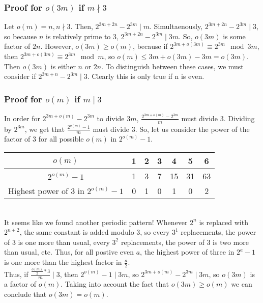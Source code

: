 \documentclass{article}
\begin{document}
  \subsubsection{Proof for  $o(3m)$ if $m \nmid 3$}
  Let $o(m) = n, n \nmid 3$. Then, $2^{3m+2n}-2^{3m}\mid m$. Simultaenously, $2^{3m+2n}-2^{3m} \mid 3$, so because $n$ is relatively prime to 3, $2^{3m+2n} - 2^{3m} \mid 3m$. So, $o(3m)$ is some factor of $2n$. However, $o(3m) \geq o(m)$, because if $2^{3m+o(3m)} \equiv 2^{3m} \mod 3m$, then $2^{3m+o(3m)} \equiv 2^{3m} \mod m$, so $o(m) \leq 3m+o(3m) - 3m = o(3m)$. Then $o(3m)$ is either $n$ or $2n$. To distinguish between these cases, we must consider if $2^{3m + n} - 2^{3m} \mid 3$. Clearly this is only true if n is even.
  \subsubsection{Proof for $o(m)$ if $m \mid 3$}
  In order for $2^{3m + o(m)} - 2^{3m}$ to divide $3m$, $\frac{2^{3m + o(m)} - 2^{3m}}{m}$ must divide 3. Dividing by $2^{3m}$, we get that $\frac{2^{o(m)}-1}{m}$ must divide 3. So, let us consider the power of the factor of 3 for all possible $o(m)$ in $2^{o(m)}-1$.\\
  \begin{tabular} {|c|c|c|c|c|c|c|}
    \hline $o(m)$                              & 1 & 2 & 3 & 4  &  5 & 6 \\
    \hline $2^{o(m)}-1$                         & 1 & 3 & 7 & 15 & 31 & 63\\
    \hline Highest power of 3 in $2^{o(m)}-1$   & 0 & 1 & 0 & 1  & 0  & 2 \\
    \hline 
  \end{tabular}\\
  
  It seems like we found another periodic pattern! Whenever $2^n$ is replaced with $2^{n+2}$, the same constant is added modulo 3, so every $3^1$ replacements, the power of 3 is one more than usual, every $3^2$ replacements, the power of 3 is two more than usual, etc. Thus, for all postive even $a$, the highest power of three in $2^a - 1$ is one more than the highest factor in $\frac{a}{2}$.\\

  Thus, if $\frac{\frac{o(m)}{2} * 3}{m} \mid 3$, then $2^{o(m)}-1 \mid 3m$, so $2^{3m + o(m)}-2^{3m} \mid 3m$, so $o(3m)$ is a factor of $o(m)$. Taking into account the fact that $o(3m) \geq o(m)$ we can conclude that $o(3m) = o(m)$.\\
\end{document}
